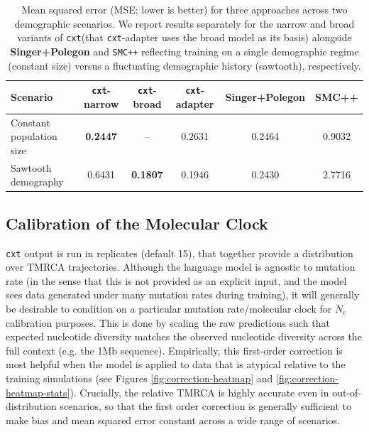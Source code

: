 \documentclass{article}
\newcommand{\cxtkit}{\texttt{cxt}\xspace}
\newcommand{\smcpp}{\texttt{SMC++}\xspace}
\begin{document}
\begin{table}[t!]
    \centering
    \caption{
        Mean squared error (MSE; lower is better) for three approaches across two demographic scenarios. We report results separately for the narrow and broad variants of \cxtkit (that \cxtkit-adapter uses the broad model as its basis) alongside \textbf{Singer+Polegon} and \smcpp reflecting training on a single demographic regime (constant size) versus a fluctuating demographic history (sawtooth), respectively.
    }
    \label{tab:mses}
    \begin{tabular}{lccccc}
    \toprule
    \textbf{Scenario} 
        & \textbf{\cxtkit-narrow} 
        & \textbf{\cxtkit-broad} 
        & \textbf{\cxtkit-adapter} 
        & \textbf{Singer+Polegon} 
        & \textbf{SMC++} \\
    \midrule
    Constant population size      
        & \textbf{0.2447} 
        & -- 
        & 0.2631
        & 0.2464 
        & 0.9032 \\
    Sawtooth demography           
        & 0.6431 
        & \textbf{0.1807} 
        & 0.1946
        & 0.2430 
        & 2.7716 \\
    \bottomrule
    \end{tabular}
\end{table}



\subsection*{Calibration of the Molecular Clock}
\label{app:clock}

\cxtkit output is run in replicates (default 15), that together provide a distribution over TMRCA trajectories. 
Although the language model is agnostic to mutation rate (in the sense that this is not provided as an explicit input, and
the model sees data generated under many mutation rates during training), it will generally be desirable to condition on a particular mutation rate/molecular clock for $N_{e}$ calibration purposes. 
This is done by scaling the raw predictions such that expected nucleotide diversity matches the observed nucleotide diversity
across the full context (e.g. the 1Mb sequence).
Empirically, this first-order correction is most helpful when the model is applied to data that is atypical relative to the 
training simulations (see Figures \ref{fig:correction-heatmap} and \ref{fig:correction-heatmap-stats}).
Crucially, the relative TMRCA is highly accurate even in out-of-distribution scenarios, so that the first order correction
is generally sufficient to make bias and mean squared error constant across a wide range of scenarios.
\end{document}
